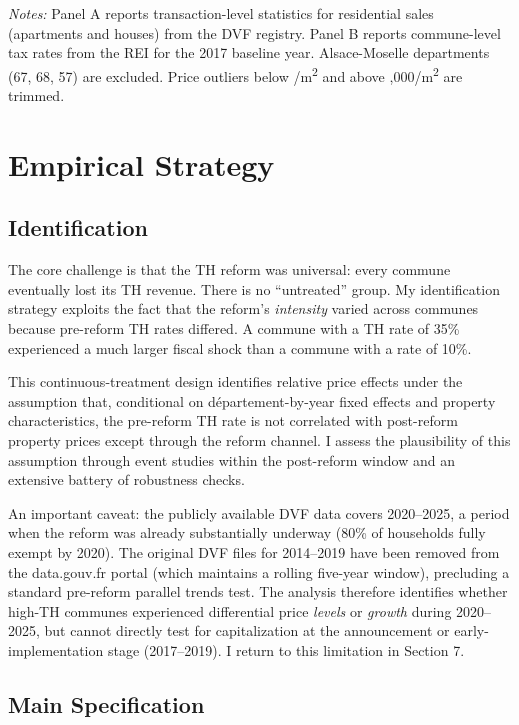 \documentclass[12pt]{article}
\begin{document}


\noindent\emph{Notes:} Panel A reports transaction-level statistics for residential sales (apartments and houses) from the DVF registry. Panel B reports commune-level tax rates from the REI for the 2017 baseline year. Alsace-Moselle departments (67, 68, 57) are excluded. Price outliers below /m\textsuperscript{2} and above ,000/m\textsuperscript{2} are trimmed.


\section{Empirical Strategy}

\subsection{Identification}

The core challenge is that the TH reform was universal: every commune eventually lost its TH revenue. There is no ``untreated'' group. My identification strategy exploits the fact that the reform's \emph{intensity} varied across communes because pre-reform TH rates differed. A commune with a TH rate of 35\% experienced a much larger fiscal shock than a commune with a rate of 10\%.

This continuous-treatment design identifies relative price effects under the assumption that, conditional on d\'epartement-by-year fixed effects and property characteristics, the pre-reform TH rate is not correlated with post-reform property prices except through the reform channel. I assess the plausibility of this assumption through event studies within the post-reform window and an extensive battery of robustness checks.

An important caveat: the publicly available DVF data covers 2020--2025, a period when the reform was already substantially underway (80\% of households fully exempt by 2020). The original DVF files for 2014--2019 have been removed from the data.gouv.fr portal (which maintains a rolling five-year window), precluding a standard pre-reform parallel trends test. The analysis therefore identifies whether high-TH communes experienced differential price \emph{levels} or \emph{growth} during 2020--2025, but cannot directly test for capitalization at the announcement or early-implementation stage (2017--2019). I return to this limitation in Section 7.

\subsection{Main Specification}
\end{document}
